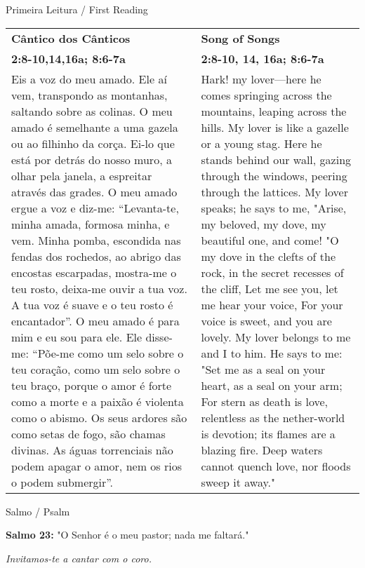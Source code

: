 \newpage
{\large Primeira Leitura / First Reading}

\begin{longtable}{p{2in}p{2in}}

  {\bf Cântico dos Cânticos} & \hfill{\bf Song of Songs}\\
  {\bf 2:8-10,14,16a; 8:6-7a} &  \hfill{\bf 2:8-10, 14, 16a; 8:6-7a}\\

Eis a voz do meu amado. Ele aí vem, transpondo as montanhas, saltando sobre as colinas. O meu amado é semelhante a uma gazela ou ao filhinho da corça. Ei-lo que está por detrás do nosso muro, a olhar pela janela, a espreitar através das grades.
O meu amado ergue a voz e diz-me: “Levanta-te, minha amada, formosa minha, e vem. Minha pomba, escondida nas fendas dos rochedos, ao abrigo das encostas escarpadas, mostra-me o teu rosto, deixa-me ouvir a tua voz. A tua voz é suave e o teu rosto é encantador”.
O meu amado é para mim e eu sou para ele.
Ele disse-me: “Põe-me como um selo sobre o teu coração, como um selo sobre o teu braço, porque o amor é forte como a morte e a paixão é violenta como o abismo. Os seus ardores são como setas de fogo, são chamas divinas. As águas torrenciais não podem apagar o amor, nem os rios o podem submergir”.

&
  
  
Hark! my lover—here he comes springing across the
mountains, leaping across the hills.
My lover is like a gazelle or a young stag.
Here he stands behind our wall, gazing through the windows,
peering through the lattices.
My lover speaks; he says to me,
"Arise, my beloved, my dove, my beautiful one, and come!
"O my dove in the clefts of the rock, in the secret
recesses of the cliff,
Let me see you, let me hear your voice,
For your voice is sweet, and you are lovely.
My lover belongs to me and I to him.
He says to me:
"Set me as a seal on your heart, as a seal on your arm;
For stern as death is love, relentless as the nether-world is
devotion; its flames are a blazing fire. Deep waters cannot
quench love, nor floods sweep it away."

\end{longtable}


{\large Salmo / Psalm}


{\bf Salmo 23:} "O Senhor é o meu pastor; nada me faltará." 

{\it Invitamos-te a cantar com o coro.}

\vspace{10pt}

